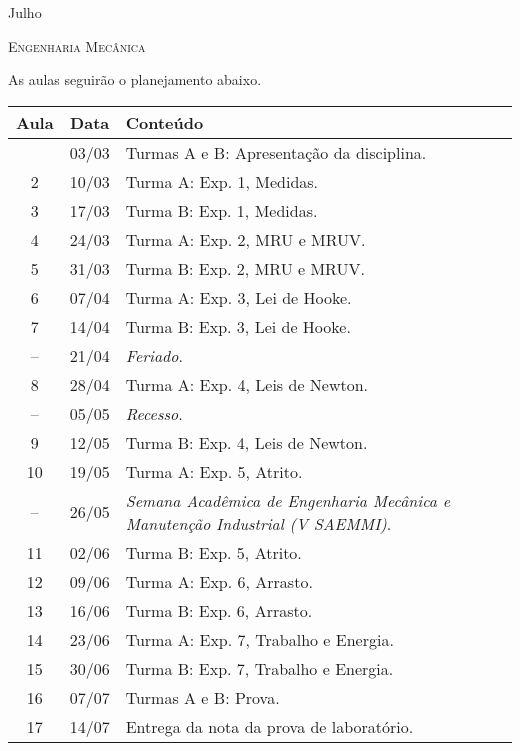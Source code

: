 \begin{marginfigure}
\centering
Julho\\
\end{marginfigure}
\vspace{1cm}
\begin{center}
\Large\textsc{Engenharia Mecânica}
\end{center}

As aulas seguirão o planejamento abaixo.
\begin{center}
\begin{longtable}{ccp{70mm}}
\toprule
Aula & Data & Conteúdo \\
\midrule
\endhead
\bottomrule
\endfoot
 1 & 03/03 & Turmas A e B: Apresentação da disciplina. \\
 2 & 10/03 & Turma A: Exp. 1, Medidas. \\
 3 & 17/03 & Turma B: Exp. 1, Medidas. \\
 4 & 24/03 & Turma A: Exp. 2, MRU e MRUV. \\ 
 5 & 31/03 & Turma B: Exp. 2, MRU e MRUV. \\
 6 & 07/04 & Turma A: Exp. 3, Lei de Hooke. \\
 7 & 14/04 & Turma B: Exp. 3, Lei de Hooke. \\
-- & 21/04 & \emph{Feriado}. \\
 8 & 28/04 & Turma A: Exp. 4, Leis de Newton. \\
-- & 05/05 & \emph{Recesso}. \\
 9 & 12/05 & Turma B: Exp. 4, Leis de Newton. \\
10 & 19/05 & Turma A: Exp. 5, Atrito. \\
-- & 26/05 & \emph{Semana Acadêmica de Engenharia Mecânica e Manutenção Industrial (V SAEMMI)}. \\
11 & 02/06 & Turma B: Exp. 5, Atrito. \\
12 & 09/06 & Turma A: Exp. 6, Arrasto. \\
13 & 16/06 & Turma B: Exp. 6, Arrasto. \\
14 & 23/06 & Turma A: Exp. 7, Trabalho e Energia. \\
15 & 30/06 & Turma B: Exp. 7, Trabalho e Energia. \\
16 & 07/07 & Turmas A e B: Prova. \\
17 & 14/07 & Entrega da nota da prova de laboratório.
\end{longtable}
\end{center}

